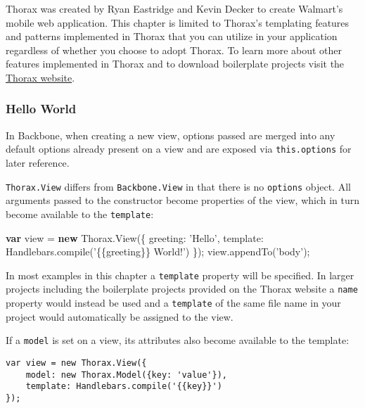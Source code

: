 \documentclass[9pt]{book}
\newenvironment{Shaded}{}{}
\newcommand{\KeywordTok}[1]{\textcolor[rgb]{0.00,0.44,0.13}{\textbf{{#1}}}}
\newcommand{\DataTypeTok}[1]{\textcolor[rgb]{0.56,0.13,0.00}{{#1}}}
\newcommand{\StringTok}[1]{\textcolor[rgb]{0.25,0.44,0.63}{{#1}}}
\newcommand{\OtherTok}[1]{\textcolor[rgb]{0.00,0.44,0.13}{{#1}}}
\newcommand{\FunctionTok}[1]{\textcolor[rgb]{0.02,0.16,0.49}{{#1}}}
\newcommand{\NormalTok}[1]{{#1}}
\begin{document}
Thorax was created by Ryan Eastridge and Kevin Decker to create
Walmart's mobile web application. This chapter is limited to Thorax's
templating features and patterns implemented in Thorax that you can
utilize in your application regardless of whether you choose to adopt
Thorax. To learn more about other features implemented in Thorax and to
download boilerplate projects visit the
\href{http://thoraxjs.org}{Thorax website}.

\subsubsection{Hello World}\label{hello-world}

In Backbone, when creating a new view, options passed are merged into
any default options already present on a view and are exposed via
\texttt{this.options} for later reference.

\texttt{Thorax.View} differs from \texttt{Backbone.View} in that there
is no \texttt{options} object. All arguments passed to the constructor
become properties of the view, which in turn become available to the
\texttt{template}:

\begin{Shaded}
\begin{Highlighting}[]
    \KeywordTok{var} \NormalTok{view = }\KeywordTok{new} \OtherTok{Thorax}\NormalTok{.}\FunctionTok{View}\NormalTok{(\{}
        \DataTypeTok{greeting}\NormalTok{: }\StringTok{'Hello'}\NormalTok{,}
        \DataTypeTok{template}\NormalTok{: }\OtherTok{Handlebars}\NormalTok{.}\FunctionTok{compile}\NormalTok{(}\StringTok{'\{\{greeting\}\} World!'}\NormalTok{)}
    \NormalTok{\});}
    \OtherTok{view}\NormalTok{.}\FunctionTok{appendTo}\NormalTok{(}\StringTok{'body'}\NormalTok{);}
\end{Highlighting}
\end{Shaded}

In most examples in this chapter a \texttt{template} property will be
specified. In larger projects including the boilerplate projects
provided on the Thorax website a \texttt{name} property would instead be
used and a \texttt{template} of the same file name in your project would
automatically be assigned to the view.

If a \texttt{model} is set on a view, its attributes also become
available to the template:

\begin{verbatim}
var view = new Thorax.View({
    model: new Thorax.Model({key: 'value'}),
    template: Handlebars.compile('{{key}}')
});
\end{verbatim}
\end{document}
